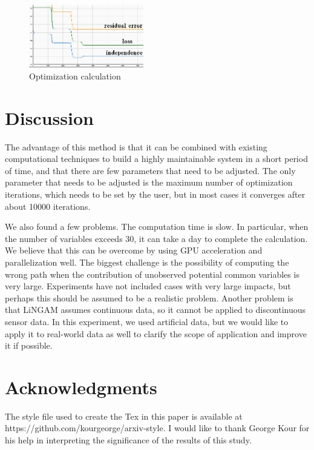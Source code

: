 \documentclass[pdftex]{article}
\begin{document}
\begin{figure}[H]
	\centering
	\includegraphics[width=5cm]{fig5.png}
	\caption{Optimization calculation}
	\label{fig5}
\end{figure}

\section{Discussion}
The advantage of this method is that it can be combined with existing computational techniques to build a highly maintainable system in a short period of time, and that there are few parameters that need to be adjusted.
The only parameter that needs to be adjusted is the maximum number of optimization iterations, which needs to be set by the user, but in most cases it converges after about 10000 iterations.

We also found a few problems.
The computation time is slow. In particular, when the number of variables exceeds 30, it can take a day to complete the calculation. We believe that this can be overcome by using GPU acceleration and parallelization well.
The biggest challenge is the possibility of computing the wrong path when the contribution of unobserved potential common variables is very large. Experiments have not included cases with very large impacts, but perhaps this should be assumed to be a realistic problem.
Another problem is that LiNGAM assumes continuous data, so it cannot be applied to discontinuous sensor data.
In this experiment, we used artificial data, but we would like to apply it to real-world data as well to clarify the scope of application and improve it if possible.

\section{Acknowledgments}
The style file used to create the Tex in this paper is available at https://github.com/kourgeorge/arxiv-style.
I would like to thank George Kour for his help in interpreting the significance of the results of this study.

%

\end{document}
